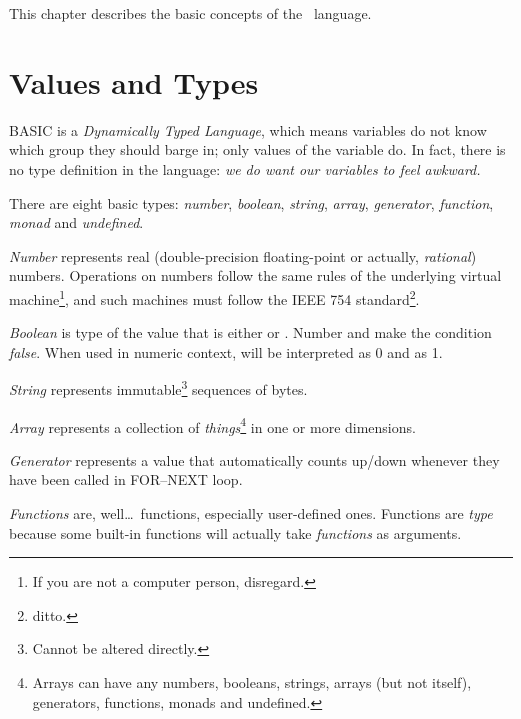 \quad
{}

This chapter describes the basic concepts of the \tbas\ language.


\section{Values and Types}
\label{valuesandtypes}

BASIC is a \emph{Dynamically Typed Language}, which means variables do not know which group they should barge in; only values of the variable do. In fact, there is no type definition in the language: \emph{we do want our variables to feel awkward.}

There are eight basic types: \emph{number}, \emph{boolean}, \emph{string}, \emph{array}, \emph{generator}, \emph{function}, \emph{monad} and \emph{undefined}.

\emph{Number} represents real (double-precision floating-point or actually, \emph{rational}) numbers. Operations on numbers follow the same rules of the underlying virtual machine\footnote{If you are not a computer person, disregard.}, and such machines must follow the IEEE 754 standard\footnote{ditto.}. 

\emph{Boolean} is type of the value that is either  or . Number  and  make the condition \emph{false}. When used in numeric context,  will be interpreted as 0 and  as 1.

\emph{String} represents immutable\footnote{Cannot be altered directly.} sequences of bytes.

\emph{Array} represents a collection of \emph{things}\footnote{Arrays can have any numbers, booleans, strings, arrays (but not itself), generators, functions, monads and undefined.} in one or more dimensions.

\emph{Generator} represents a value that automatically counts up/down whenever they have been called in FOR--NEXT loop.

\emph{Functions} are, well\ldots\ functions, especially user-defined ones. Functions are \emph{type} because some built-in functions will actually take \emph{functions} as arguments.

